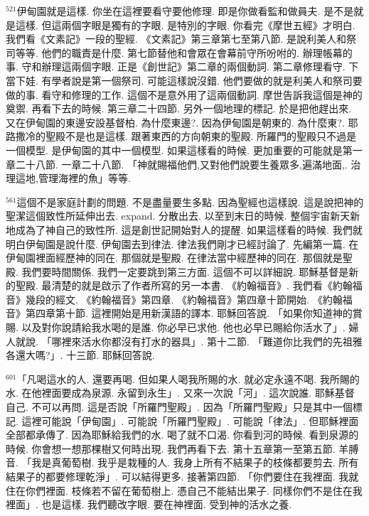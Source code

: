 \documentclass{book}
\begin{document}
$^{521}$伊甸園就是這樣.
你坐在這裡要看守要他修理.
即是你做看監和做員夫.
是不是就是這樣.
但這兩個字眼是獨有的字眼.
是特別的字眼.
你看完《摩世五經》才明白.
我們看《文素記》一段的聖經.
《文素記》第三章第七至第八節.
是說利美人和祭司等等.
他們的職責是什麼.
第七節替他和會眾在會幕前守所吩咐的.
辦理帳幕的事.
守和辦理這兩個字眼.
正是《創世記》第二章的兩個動詞.
第二章修理看守.
下當下娃.
有學者說是第一個祭司.
可能這樣說沒錯.
他們要做的就是利美人和祭司要做的事.
看守和修理的工作.
這個不是意外用了這兩個動詞.
摩世告訴我這個是神的奠禦.
再看下去的時候.
第三章二十四節.
另外一個地理的標記.
於是把他趕出來.
又在伊甸園的東邊安設基督柏.
為什麼東邊?.
因為伊甸園是朝東的.
為什麼東?.
耶路撒冷的聖殿不是也是這樣.
跟著東西的方向朝東的聖殿.
所羅門的聖殿只不過是一個模型.
是伊甸園的其中一個模型.
如果這樣看的時候.
更加重要的可能就是第一章二十八節.
一章二十八節.
「神就賜福他們,又對他們說要生養眾多,遍滿地面,.
治理這地,管理海裡的魚」等等.

$^{561}$這個不是家庭計劃的問題.
不是盡量要生多點.
因為聖經也這樣說.
這是說把神的聖潔這個致性所延伸出去.
expand.
分散出去.
以至到末日的時候.
整個宇宙新天新地成為了神自己的致性所.
這是創世記開始對人的提醒.
如果這樣看的時候.
我們就明白伊甸園是說什麼.
伊甸園去到律法.
律法我們剛才已經討論了.
先編第一篇.
在伊甸園裡面經歷神的同在.
那個就是聖殿.
在律法當中經歷神的同在.
那個就是聖殿.
我們要時間關係.
我們一定要跳到第三方面.
這個不可以詳細說.
耶穌基督是新的聖殿.
最清楚的就是啟示了作者所寫的另一本書.
《約翰福音》.
我們看《約翰福音》幾段的經文.
《約翰福音》第四章.
《約翰福音》第四章十節開始.
《約翰福音》第四章第十節.
這裡開始是用新漢語的譯本.
耶穌回答說.
「如果你知道神的賞賜.
以及對你說請給我水喝的是誰.
你必早已求他.
他也必早已賜給你活水了」.
婦人就說.
「哪裡來活水你都沒有打水的器具」.
第十二節.
「難道你比我們的先祖雅各還大嗎?」.
十三節.
耶穌回答說.

$^{601}$「凡喝這水的人.
還要再喝.
但如果人喝我所賜的水.
就必定永遠不喝.
我所賜的水.
在他裡面要成為泉源.
永留到永生」.
又來一次說「河」.
這次說誰.
耶穌基督自己.
不可以再問.
這是否說「所羅門聖殿」.
因為「所羅門聖殿」只是其中一個標記.
這裡可能說「伊甸園」.
可能說「所羅門聖殿」.
可能說「律法」.
但耶穌裡面全部都承傳了.
因為耶穌給我們的水.
喝了就不口渴.
你看到河的時候.
看到泉源的時候.
你會想一想那棵樹又何時出現.
我們再看下去.
第十五章第一至第五節.
羊膊音.
「我是真葡萄樹.
我乎是栽種的人.
我身上所有不結果子的枝條都要剪去.
所有結果子的都要修理乾淨」.
可以結得更多.
接著第四節.
「你們要住在我裡面.
我就住在你們裡面.
枝條若不留在葡萄樹上.
憑自己不能結出果子.
同樣你們不是住在我裡面」.
也是這樣.
我們聽改字眼.
要在神裡面.
受到神的活水之養.
\end{document}
